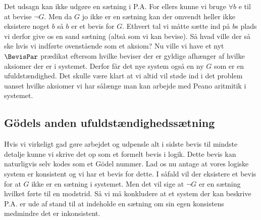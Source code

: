 Det udsagn kan ikke udgøre en sætning i P.A. For ellers kunne vi bruge $\forall b$ e til at bevise $\neg G$. Men da $G$ jo ikke er en sætning
kan der omvendt heller ikke eksistere noget $b$ så $b$ er et bevis for $G$. Ethvert tal vi måtte sætte ind på $b$s plads vi derfor give
os en sand sætning (altså som vi kan bevise). Så hvad ville der så ske hvis vi indførte ovenstående som et aksiom?
Nu ville vi have et nyt $\BevisPar$ prædikat eftersom hvilke beviser der er gyldige afhænger af hvilke aksiomer der er i systemet.
Derfor får det nye system også en ny $G$ som er en ufuldstændighed. Det skulle være klart at vi altid vil støde ind i det problem
uanset hvilke aksiomer vi har sålænge man kan arbejde med Peano aritmitik i systemet.

\subsection{Gödels anden ufuldstændighedssætning}
Hvis vi virkeligt gad gøre arbejdet og udpensle alt i sidste bevis til mindste detalje kunne vi skrive det op som et formelt bevis i logik.
Dette bevis kan naturligvis selv kodes som et Gödel nummer.
Lad os nu antage at vores logiske system er konsistent og vi har et bevis for dette.
I såfald vil der eksistere et bevis for at $G$ ikke er en sætning i systemet.
Men det vil sige at $\neg G$ er en sætning hvilket førte til en modstrid.
Så vi må konkludere at et system der kan beskrive P.A. er ude af stand til at indeholde en sætning om sin egen konsistens medmindre det er inkonsistent.

\ifdefined\startGoedel\fi
